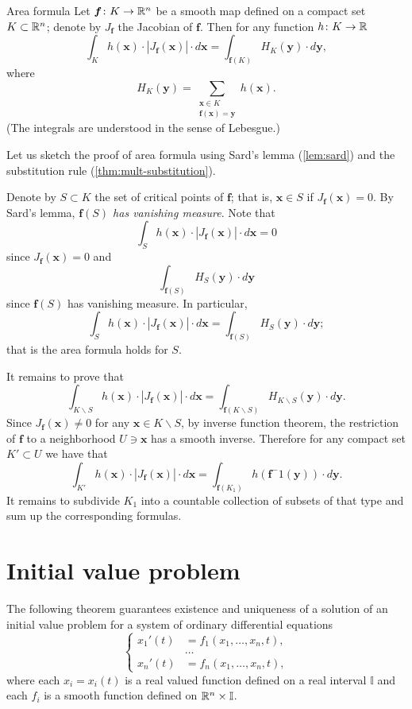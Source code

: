 \begin{thm}{Area formula}
Let $\bm{f}\colon K\to\mathbb{R}^n$ be a smooth map defined on a compact set $K\subset \mathbb{R}^n$;
denote by $J_{\bm{f}}$ the Jacobian of $\bm{f}$.
Then for any function $h\colon K\to \mathbb{R}$
\[\int_K h(\bm{x})\cdot |J_{\bm{f}}(\bm{x})|\cdot d\bm{x}=\int_{\bm{f}(K)} H_K(\bm{y})\cdot d\bm{y},\]
where 
\[H_K(\bm{y})=\sum_{\substack{\bm{x}\in K \\ \bm{f}(\bm{x})=\bm{y}}}h(\bm{x}).\]
(The integrals are understood in the sense of Lebesgue.)
\end{thm}

Let us sketch the proof of area formula using  Sard's lemma (\ref{lem:sard}) and the substitution rule (\ref{thm:mult-substitution}).

Denote by $S\subset K$ the set of critical points of $\bm{f}$; that is, $\bm{x}\in S$ if $J_{\bm{f}}(\bm{x})=0$.
By Sard's lemma,
\emph{$\bm{f}(S)$ has vanishing measure}.
Note that 
\[\int_S h(\bm{x})\cdot |J_{\bm{f}}(\bm{x})|\cdot d\bm{x}=0\]
since $J_{\bm{f}}(\bm{x})=0$
and
\[\int_{\bm{f}(S)} H_S(\bm{y})\cdot d\bm{y}\]
since $\bm{f}(S)$ has vanishing measure.
In particular,
\[\int_S h(\bm{x})\cdot |J_{\bm{f}}(\bm{x})|\cdot d\bm{x}=\int_{\bm{f}(S)} H_S(\bm{y})\cdot d\bm{y};\]
that is the area formula holds for $S$.

It remains to prove that 
\[\int_{K\backslash S} h(\bm{x})\cdot |J_{\bm{f}}(\bm{x})|\cdot d\bm{x}=\int_{\bm{f}(K\backslash S)} H_{K\backslash S}(\bm{y})\cdot d\bm{y}.\]
Since $J_{\bm{f}}(\bm{x})\ne 0$ for any $\bm{x}\in K\backslash S$, by inverse function theorem, the restriction of $\bm{f}$ to a neighborhood $U\ni\bm{x}$ has a smooth inverse.
Therefore for any compact set $K'\subset U$ we have that %
\[\int_{K'}h(\bm{x})\cdot |J_{\bm{f}}(\bm{x})|\cdot d\bm{x}=\int_{\bm{f}(K_1)} h(\bm{f}^-1(\bm{y}))\cdot d\bm{y}.\]
It remains to subdivide $K_1$ into a countable collection of subsets of that type and sum up the corresponding formulas.\qeds

\section{Initial value problem}

The following theorem guarantees existence and uniqueness of a solution of an initial value problem
for a system of ordinary differential equations
\[
\begin{cases}
x_1'(t)&=f_1(x_1,\dots,x_n,t),
\\
&\dots
\\
x_n'(t)&=f_n(x_1,\dots,x_n,t),
\end{cases}
\]
where each $x_i=x_i(t)$ is a real valued function defined on a real interval $\mathbb{I}$
and each $f_i$ is a smooth function defined on $\mathbb{R}^n\times \mathbb{I}$.

